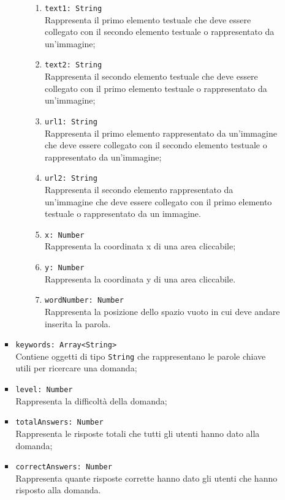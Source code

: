 \begin{itemize}
\begin{itemize}
\begin{itemize}
\begin{itemize}
\begin{enumerate}
        				\item \texttt{text1: String}\\ Rappresenta il primo elemento testuale che deve essere collegato con il secondo elemento testuale o rappresentato da un'immagine;
        				\item \texttt{text2: String}\\ Rappresenta il secondo elemento testuale che deve essere collegato con il primo elemento testuale o rappresentato da un'immagine;
        				\item \texttt{url1: String}\\ Rappresenta il primo elemento rappresentato da un'immagine che deve essere collegato con il secondo elemento testuale o rappresentato da un'immagine;
        				\item \texttt{url2: String}\\ Rappresenta il secondo elemento rappresentato da un'immagine che deve essere collegato con il primo elemento testuale o rappresentato da un immagine.
						
        				\item \texttt{x: Number}\\ Rappresenta la coordinata x di una area cliccabile;
        				\item \texttt{y: Number}\\ Rappresenta la coordinata y di una area cliccabile.  
						
        				\item \texttt{wordNumber: Number}\\ Rappresenta la posizione dello spazio vuoto in cui deve andare inserita la parola.      						  						
					\end{enumerate}
				\end{itemize}			
			\item \texttt{keywords: Array<String>}\\ Contiene oggetti di tipo \texttt{String} che rappresentano le parole chiave utili per ricercare una domanda;	 
			\item \texttt{level: Number}\\ Rappresenta la difficoltà della domanda;
			\item \texttt{totalAnswers: Number}\\ Rappresenta le risposte totali che tutti gli utenti hanno dato alla domanda;
			\item \texttt{correctAnswers: Number}\\ Rappresenta quante risposte corrette hanno dato gli utenti che hanno risposto alla domanda.
		

\end{itemize}
\end{itemize}
\end{itemize}
